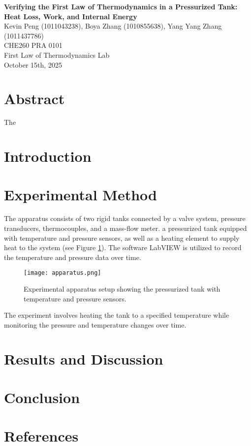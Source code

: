 \documentclass[12pt]{article}
\begin{document}
\begin{center}
\textbf{\Large Verifying the First Law of Thermodynamics in a Pressurized Tank: Heat Loss, Work, and Internal Energy} \\[0.5em]
Kevin Peng (1011043238), Boya Zhang (1010855638), Yang Yang Zhang (1011437786)\\[0.5em]
CHE260 PRA 0101 \\
First Law of Thermodynamics Lab \\
October 15th, 2025 \\
\end{center}

\section*{Abstract}
The 

\section{Introduction}

\section{Experimental Method}
The apparatus consists of two rigid tanks connected by a valve system, pressure transducers, thermocouples, and a mass-flow meter.
a pressurized tank equipped with temperature and pressure sensors, as well as a heating element to supply heat to the system (see Figure \ref{fig:apparatus}).
The software LabVIEW is utilized to record the temperature and pressure data over time.
\begin{figure}[H]
    \centering
    \texttt{[image: apparatus.png]}
    \caption{Experimental apparatus setup showing the pressurized tank with temperature and pressure sensors.}
    \label{fig:apparatus}
\end{figure}


The experiment involves heating the tank to a specified temperature while monitoring the pressure and temperature changes over time.


\section{Results and Discussion}

\section{Conclusion}


\section{References}






\newpage
\begin{thebibliography}{9}

\end{thebibliography}
\end{document}
